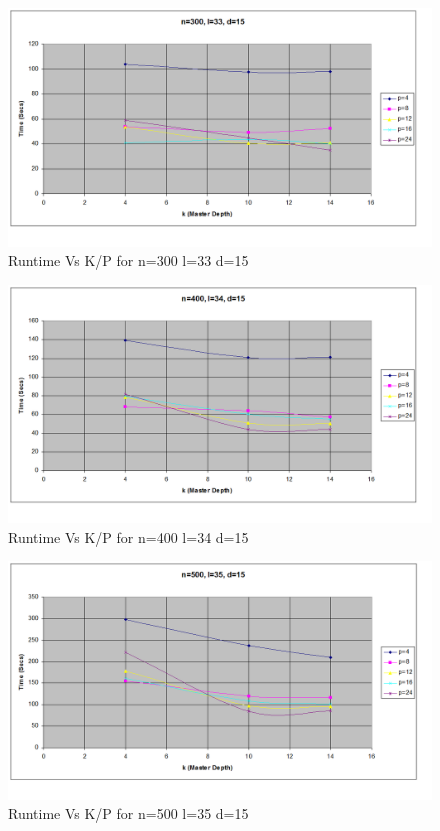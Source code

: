 \documentclass[twoside,11pt]{article}\usepackage{amsmath,amsfonts,amsthm,fullpage}
\begin{document}
\begin{figure}[!htbp]
\centering
\includegraphics[scale=.46]{images/nld_n=300-l=33-d=15} 
\caption{Runtime Vs K/P for n=300 l=33 d=15}
\label{K Vs P for n=300 l=33 d=15}
\end{figure}

\begin{figure}[!htbp]
\centering
\includegraphics[scale=.46]{images/nld_n=400-l=34-d=15} 
\caption{Runtime Vs K/P for n=400 l=34 d=15}
\label{K Vs P for n=400 l=34 d=15}
\end{figure}

\begin{figure}[!htbp]
\centering
\includegraphics[scale=.46]{images/nld_n=500-l=35-d=15} 
\caption{Runtime Vs K/P for n=500 l=35 d=15}
\label{K Vs P for n=500 l=35 d=15}
\end{figure}
\end{document}
